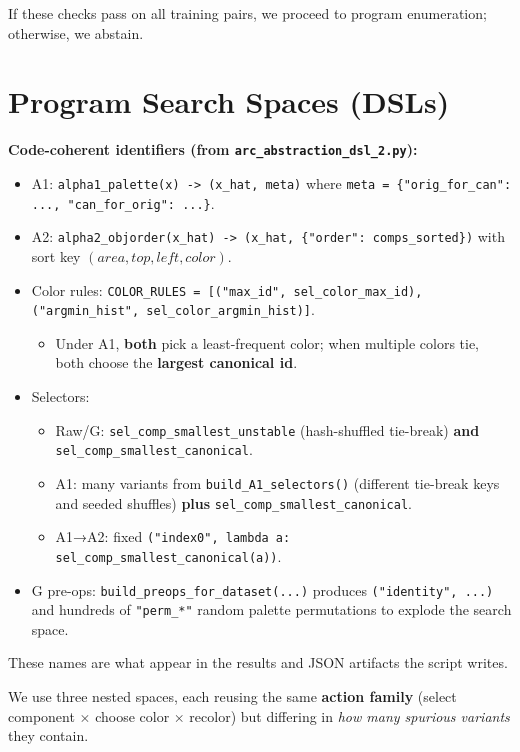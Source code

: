 \documentclass[11pt]{article}
\newcommand{\code}[1]{\texttt{#1}}
\begin{document}
If these checks pass on all training pairs, we proceed to program enumeration; otherwise, we abstain.

\section{Program Search Spaces (DSLs)}

\textbf{Code-coherent identifiers (from \code{arc\_abstraction\_dsl\_2.py}):}
\begin{itemize}
\item A1: \code{alpha1\_palette(x) -> (x\_hat, meta)} where \code{meta = \{"orig\_for\_can": ..., "can\_for\_orig": ...\}}.
\item A2: \code{alpha2\_objorder(x\_hat) -> (x\_hat, \{"order": comps\_sorted\})} with sort key $(area, top, left, color)$.
\item Color rules: \code{COLOR\_RULES = [("max\_id", sel\_color\_max\_id), ("argmin\_hist", sel\_color\_argmin\_hist)]}.
  \begin{itemize}
  \item Under A1, \textbf{both} pick a least-frequent color; when multiple colors tie, both choose the \textbf{largest canonical id}.
  \end{itemize}
\item Selectors:
  \begin{itemize}
  \item Raw/G: \code{sel\_comp\_smallest\_unstable} (hash-shuffled tie-break) \textbf{and} \code{sel\_comp\_smallest\_canonical}.
  \item A1: many variants from \code{build\_A1\_selectors()} (different tie-break keys and seeded shuffles) \textbf{plus} \code{sel\_comp\_smallest\_canonical}.
  \item A1→A2: fixed \code{("index0", lambda a: sel\_comp\_smallest\_canonical(a))}.
  \end{itemize}
\item G pre-ops: \code{build\_preops\_for\_dataset(...)} produces \code{("identity", ...)} and hundreds of \code{"perm\_*"} random palette permutations to explode the search space.
\end{itemize}

These names are what appear in the results and JSON artifacts the script writes.

We use three nested spaces, each reusing the same \textbf{action family} (select component $\times$ choose color $\times$ recolor) but differing in \emph{how many spurious variants} they contain.
\end{document}
